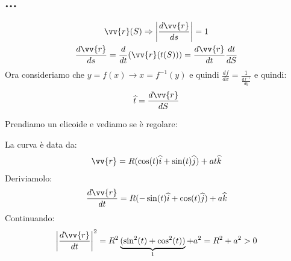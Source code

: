 \documentclass[a4paper, oneside]{article}
\begin{document}
\subsection{...}
\begin{gather*}
    \vv{r}(S) \Rightarrow \left\lvert \frac{d \vv{r}}{ds} \right\rvert = 1\\
    \frac{d \vv{r}}{ds} = \frac{d}{dt} (\vv{r}(t(S))) = \frac{d \vv{r}}{dt} \frac{dt}{dS} 
\end{gather*}
Ora consideriamo che $y= f(x) \to x = f^{-1}(y)$ e quindi $\frac{df}{dx} = \frac{1}{\frac{df^{-1}}{dy}}$ e quindi:
\begin{gather*}
    \widehat{t} = \frac{d\vv{r}}{dS}
\end{gather*}
\begin{example}
    Prendiamo un elicoide e vediamo se è regolare:
    \begin{center}
    \end{center}
    La curva è data da:
    \begin{gather*}
        \vv{r} = R (\cos(t) \widehat{i} + \sin(t) \widehat{j}) + a t \widehat{k}
    \end{gather*}
    Deriviamolo:
    \begin{gather*}
        \frac{d\vv{r}}{dt} = R (-\sin(t) \widehat{i} + \cos(t) \widehat{j}) + a \widehat{k}
    \end{gather*}
    Continuando:
    \begin{gather*}
        \left\lvert \frac{d\vv{r}}{dt} \right\rvert^2 = R^2 \underbrace{(\sin^2(t) + \cos^2(t))}_1 + a^2 = R^2 + a^2 > 0
    \end{gather*}
\end{example}
\end{document}
